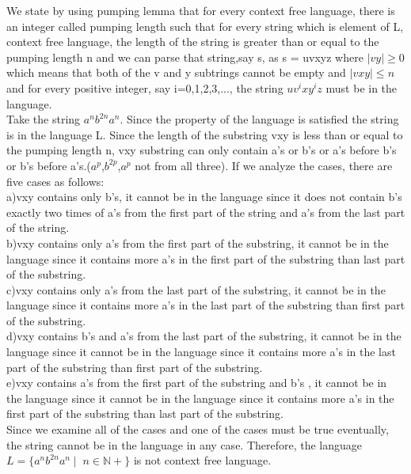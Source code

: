 \documentclass[a4paper,12pt]{article}
\begin{document}
\begin{tcolorbox}
We state by using pumping lemma that for every context free language, there is an integer called pumping length such that for every string which is element of L, context free language, the length of the string is greater than or equal to the pumping length n and we can parse that string,say s, as s = uvxyz where $|vy| \geq 0$ which means that both of the v and y subtrings cannot be empty and $|vxy| \leq n$ and for every positive integer, say i=0,1,2,3,..., the string $uv^ixy^iz$ must be in the language. \\
Take the string $a^nb^{2n}a^n$. Since the property of the language is satisfied the string is in the language L. Since the length of the substring vxy is less than or equal to the pumping length n, vxy substring can only contain a's or b's or a's before b's or b's before a's.($a^p$,$b^{2p}$,$a^p$ not from all three). If we analyze the cases, there are five cases as follows: \\
a)vxy contains only b's, it cannot be in the language since it does not contain b's exactly two times of a's from the first part of the string and a's from the last part of the string. \\
b)vxy contains only a's from the first part of the substring, it cannot be in the language since it contains more a's in the first part of the substring than last part of the substring. \\
c)vxy contains only a's from the last part of the substring, it cannot be in the language since it contains more a's in the last part of the substring than first part of the substring. \\
d)vxy contains b's and a's from the last part of the substring, it cannot be in the language since it cannot be in the language since it contains more a's in the last part of the substring than first part of the substring. \\
e)vxy contains a's from the first part of the substring and b's , it cannot be in the language since it cannot be in the language since it contains more a's in the first part of the substring than last part of the substring. \\

Since we examine all of the cases and one of the cases must be true eventually, the string cannot be in the language in any case. Therefore, the language $L=\{a^n b^{2n} a^n \mid \; n \in \mathbb{N+} \}$ is not context free language.
\end{tcolorbox}
\end{document}
